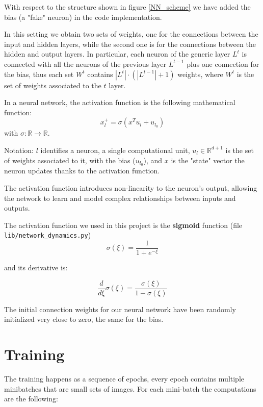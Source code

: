 \documentclass[a4paper,11pt,oneside]{book}
\begin{document}
With respect to the structure shown in figure \ref{NN_scheme} we have added the bias (a "fake" neuron) in the code implementation.

\bigskip
In this setting we obtain two sets of weights, one for the connections between the input and hidden layers, while the second one is for the connections between the hidden and output layers. In particular, each neuron of the generic layer $L^t$ is connected with all the neurons of the previous layer $L^{t-1}$ plus one connection for the bias, thus each set $W^t$ contains $|L^t| \cdot (|L^{t-1}| + 1)$ weights, where $W^t$ is the set of weights associated to the $t$ layer.

\bigskip
In a neural network, the activation function is the following mathematical function:
\begin{equation}
x_l^+= \sigma(x^T u_l + u_{l_0})
\end{equation}
with $\sigma: \mathbb{R} \to \mathbb{R}$.

Notation: $l$ identifies a neuron, a single computational unit, $u_l \in \mathbb{R}^{d+1}$ is the set of weights associated to it, with the bias ($u_{l_0}$), and $x$ is the "state" vector the neuron updates thanks to the activation function. 

\bigskip
The activation function introduces non-linearity to the neuron's output, allowing the network to learn and model complex relationships between inputs and outputs.

\bigskip
The activation function we used in this project is the \textbf{sigmoid} function (file \texttt{lib/network\_dynamics.py})
\begin{equation}
\sigma(\xi) = \frac{1}{1 + e^{-\xi}}
\end{equation}

and its derivative is:

\begin{equation}
\frac{d}{d\xi}\sigma(\xi) = \frac{\sigma(\xi)}{1 - \sigma(\xi)}
\end{equation}

The initial connection weights for our neural network have been randomly initialized very close to zero, the same for the bias.

\section{Training}
The training happens as a sequence of epochs, every epoch contains multiple minibatches that are small sets of images. For each mini-batch the computations are the following:
\end{document}
